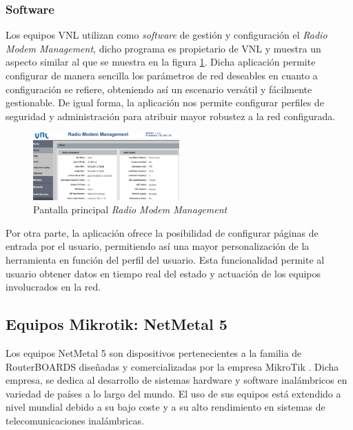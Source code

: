 \subsubsection{Software}
Los equipos VNL utilizan como \textit{software} de gestión y configuración el \textit{Radio Modem Management}, dicho programa es propietario de VNL y muestra un aspecto similar al que se muestra en la figura \ref{vnl_rm}. Dicha aplicación permite configurar de manera sencilla los parámetros de red deseables en cuanto a configuración se refiere, obteniendo así un escenario versátil y fácilmente gestionable. De igual forma, la aplicación nos permite configurar perfiles de seguridad y administración para atribuir mayor robustez a la red configurada. 

\begin{figure}[H]
		\centering
		\includegraphics[width=0.5\textwidth]{img/vnl_rm.jpg}
		\caption{Pantalla principal \textit{Radio Modem Management}}
		\label{vnl_rm}
	\end{figure}

Por otra parte, la aplicación ofrece la posibilidad de configurar páginas de entrada por el usuario, permitiendo así una mayor personalización de la herramienta en función del perfil del usuario. Esta funcionalidad permite al usuario obtener datos en tiempo real del estado y actuación de los equipos involucrados en la red. 

\subsection{Equipos Mikrotik: NetMetal 5}
Los equipos NetMetal 5 son dispositivos pertenecientes a la familia de RouterBOARDS diseñadas y comercializadas por la empresa MikroTik \cite{Mikrotik}. Dicha empresa, se dedica al desarrollo de sistemas hardware y software inalámbricos en variedad de países a lo largo del mundo. El uso de sus equipos está extendido a nivel mundial debido a su bajo coste y a su alto rendimiento en sistemas de telecomunicaciones inalámbricas.
